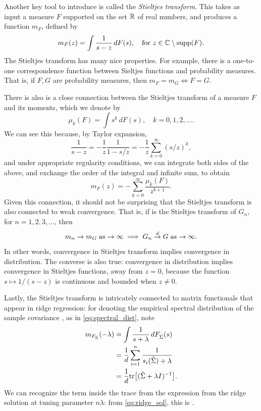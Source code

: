 \documentclass{article}
\begin{document}
Another key tool to introduce is called the \emph{Stieltjes transform}. This
takes as input a measure $F$ supported on the set $\mathbb{R}$ of real numbers, and 
produces a function $m_F$, defined by   
\begin{equation}
\label{eq:stieltjes}
m_F(z) = \int \frac{1}{s - z} \, dF(s), \quad \text{for $z \in \mathbb{C} \setminus
  \mathrm{supp}(F)$}.  
\end{equation}
The Stieltjes transform has many nice properties. For example, there is a
one-to-one correspondence function between Sieltjes functions and probability
measures. That is, if $F,G$ are probability measures, then $m_F = m_G \iff F =
G$.  

There is also is a close connection between the Stieltjes transform of a measure
$F$ and its moments, which we denote by
\[
\mu_k(F) = \int s^k \, dF(s), \quad k=0,1,2,\dots.
\]
We can see this because, by Taylor expansion,
\[
\frac{1}{s - z} = -\frac{1}{z} \frac{1}{1 - s/z} = -\frac{1}{z}
\sum_{k=0}^\infty (s/z)^k, 
\]
and under appropriate regularity conditions, we can integrate both sides of the
above, and exchange the order of the integral and infinite sum, to obtain 
\[
m_F(z) = - \sum_{k=0}^\infty \frac{\mu_k(F)}{z^{k+1}}. 
\]
Given this connection, it should not be surprising that the Stieltjes
transform is also connected to weak convergence. That is, if  is the Stieltjes transform of $G_n$, for $n=1,2,3,\dots$, then  
\[
m_n \to m_G \; \text{as $\to \infty$} \implies G_n \overset{d}{\to} G \; \text{as $\to
  \infty$}.  
\]
In other words, convergence in Stieltjes transform implies convergence in 
distribution. The converse is also true: convergence in distribution implies
convergence in Stieltjes functions, away from $z=0$, because the function $s
\mapsto 1/(s-z)$ is continuous and bounded when $z \not= 0$.     

Lastly, the Stieltjes transform is intricately connected to matrix functionals
that appear in ridge regression: for  denoting the
empirical spectral distribution of the sample covariance , as in \eqref{eq:spectral_dist}, note 
\begin{align*}
m_{F_{\hat\Sigma}}(-\lambda) 
&= \int \frac{1}{s+\lambda} \, dF_{\hat\Sigma} (s) \\
&= \frac{1}{d} \sum_{i=1}^n \frac{1}{s_i(\hat\Sigma) + \lambda} \\ 
&= \frac{1}{d} \mathrm{tr}\big[ (\hat\Sigma + \lambda I)^{-1} \big].
\end{align*}
We can recognize the term inside the trace from the expression from the ridge
solution at tuning parameter $n\lambda$: from \eqref{eq:ridge_sol}, this is
.
\end{document}
